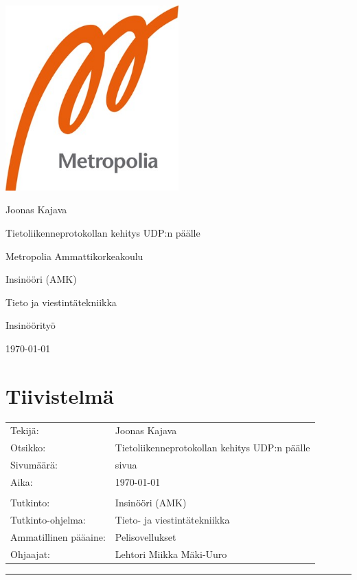 \documentclass[a4paper,12pt]{article}
\author{Joonas Kajava}
\date{\today}
\renewcommand{\title}{Tietoliikenneprotokollan kehitys UDP:n päälle}
\newcommand{\me}{Joonas Kajava}
\newcommand{\pageCount}{ \pageref{LastPage}}
\newcommand*\sepline{
    \begin{center}
        \rule[1ex]{\textwidth}{.5pt}
    \end{center}}
\begin{document}
    \begin{titlepage}
    
        \pagestyle{empty}
        
        \includegraphics[width=0.5\textwidth]{images/metropolia}\par\vspace{2cm}
        {\Large \me}\par \vspace{1cm}

        {\Huge \textcolor{title}{\title}}\par \vspace{1cm}

        \vfill

        Metropolia Ammattikorkeakoulu\par
        Insinööri (AMK)\par
        Tieto ja viestintätekniikka\par
        Insinöörityö\par
        \today

        \newpage



        \section*{Tiivistelmä}

        \begin{tabular} {l l}
            Tekijä:               & \me                                            \\
            Otsikko:              & \title                                         \\
            Sivumäärä:            & \pageCount{} sivua                             \\
            Aika:                 & \today                                         \\
            \\
            Tutkinto: & Insinööri (AMK) \\
            Tutkinto-ohjelma: & Tieto- ja viestintätekniikka \\
            Ammatillinen pääaine: & Pelisovellukset \\
            Ohjaajat: & Lehtori Miikka Mäki-Uuro\\
        \end{tabular}
        \sepline
        \begin{singlespace}
        

\end{singlespace}
\end{titlepage}
\end{document}

